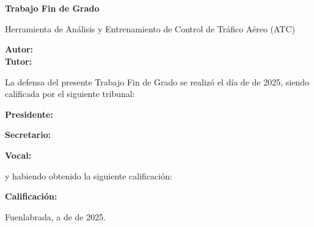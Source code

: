\chapter*{}

\vspace{-4cm}
\begin{center}
\LARGE
\textbf{Trabajo Fin de Grado}

\vspace{1cm}
\large
Herramienta de Análisis y Entrenamiento de Control de Tráfico Aéreo (ATC)

\vspace{1cm}
\large
\textbf{Autor:} \docAuthor \\
\textbf{Tutor:} \tutor

\end{center}

\vspace{1cm}
La defensa del presente Trabajo Fin de Grado se realizó el día \hspace{1.2cm} de \hspace{3.0cm} \newline de 2025, siendo calificada por el siguiente tribunal:


\vspace{1.2cm}
\textbf{Presidente:}
	
\vspace{1.2cm}
\textbf{Secretario:}

\vspace{1.2cm}
\textbf{Vocal:}


\vspace{1.2cm}
y habiendo obtenido la siguiente calificación:

\vspace{1cm}
\textbf{Calificación:}


\vspace{1cm}
\vfill{
\begin{flushright}
Fuenlabrada, a \hspace{1.2cm} de \hspace{3.0cm} de 2025.
\end{flushright}
}
